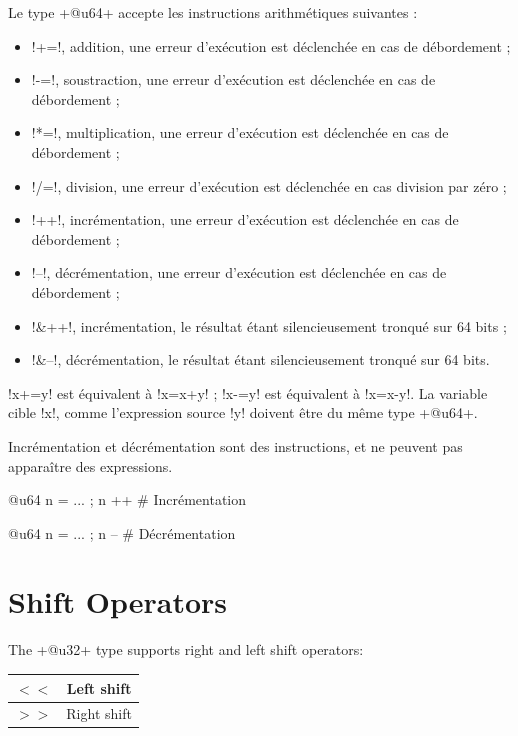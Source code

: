 Le type \ggsq+@u64+ accepte les instructions arithmétiques suivantes :
\begin{itemize}
  \item \ggsq!+=!, addition, une erreur d'exécution est déclenchée en cas de débordement ;
  \item \ggsq!-=!, soustraction, une erreur d'exécution est déclenchée en cas de débordement ;
  \item \ggsq!*=!, multiplication, une erreur d'exécution est déclenchée en cas de débordement ;
  \item \ggsq!/=!, division, une erreur d'exécution est déclenchée en cas division par zéro ;
  \item \ggsq!++!, incrémentation, une erreur d'exécution est déclenchée en cas de débordement ;
  \item \ggsq!--!, décrémentation, une erreur d'exécution est déclenchée en cas de débordement ;
  \item \ggsq!&++!, incrémentation, le résultat étant silencieusement tronqué sur 64 bits ;
  \item \ggsq!&--!, décrémentation, le résultat étant silencieusement tronqué sur 64 bits.
\end{itemize}

\ggsq!x+=y! est équivalent à \ggsq!x=x+y! ; \ggsq!x-=y! est équivalent à \ggsq!x=x-y!.
La variable cible \ggsq!x!, comme l'expression source \ggsq!y! doivent être du même type \ggsq+@u64+.

Incrémentation et décrémentation sont des instructions, et ne peuvent pas apparaître des expressions.
\begin{galgas4}
@u64 n = ... ; n ++ # Incrémentation
\end{galgas4}

\begin{galgas4}
@u64 n = ... ; n -- # Décrémentation
\end{galgas4}


\section{Shift Operators}


The \ggsq+@u32+ type supports right and left shift operators:\newline

\begin{tabular}{|c|c|}
\hline
$<<$ & Left shift \\
\hline
$>>$ & Right shift \\
\hline
\end{tabular}

